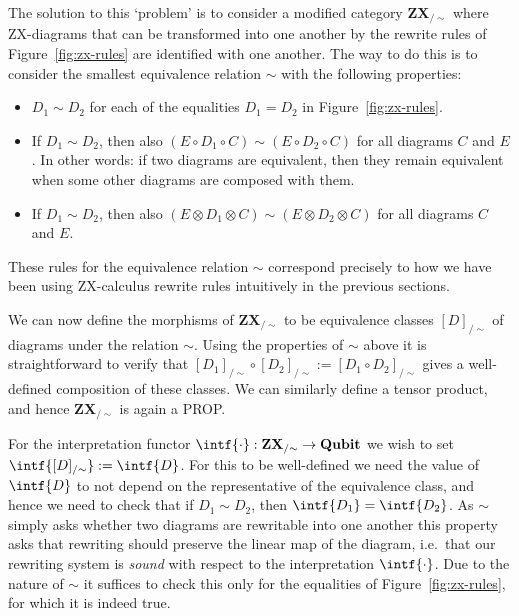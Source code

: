 \documentclass[a4paper,onecolumn,superscriptaddress,11pt,%
				unpublished,%
				allowfontchageintitle,%
				]{quantumarticle}
\begin{document}
The solution to this `problem' is to consider a modified category \textbf{ZX}$_{/\sim}$ where ZX-diagrams that can be transformed into one another by the rewrite rules of Figure~\ref{fig:zx-rules} are identified with one another. The way to do this is to consider the smallest equivalence relation $\sim$ with the following properties:
\begin{itemize}
	\item $D_1\sim D_2$ for each of the equalities $D_1=D_2$ in Figure~\ref{fig:zx-rules}.
	\item If $D_1\sim D_2$, then also $(E\circ D_1\circ C)\sim (E\circ D_2\circ C)$ for all diagrams $C$ and $E$. In other words: if two diagrams are equivalent, then they remain equivalent when some other diagrams are composed with them.
	\item If $D_1\sim D_2$, then also $(E\otimes D_1\otimes C)\sim (E\otimes D_2\otimes C)$ for all diagrams $C$ and $E$.
\end{itemize}
These rules for the equivalence relation $\sim$ correspond precisely to how we have been using ZX-calculus rewrite rules intuitively in the previous sections.

We can now define the morphisms of \textbf{ZX}$_{/\sim}$ to be equivalence classes $[D]_{/\sim}$ of diagrams under the relation $\sim$. Using the properties of $\sim$ above it is straightforward to verify that $[D_1]_{/\sim}\circ [D_2]_{/\sim} := [D_1\circ D_2]_{/\sim}$ gives a well-defined composition of these classes. We can similarly define a tensor product, and hence \textbf{ZX}$_{/\sim}$ is again a PROP.

For the interpretation functor $\intf{\cdot}:\textbf{ZX}_{/\sim}\rightarrow \textbf{Qubit}$ we wish to set $\intf{[D]_{/\sim}} := \intf{D}$. For this to be well-defined we need the value of $\intf{D}$ to not depend on the representative of the equivalence class, and hence we need to check that if $D_1\sim D_2$, then $\intf{D_1}=\intf{D_2}$. As $\sim$ simply asks whether two diagrams are rewritable into one another this property asks that rewriting should preserve the linear map of the diagram, i.e.~that our rewriting system is \emph{sound} with respect to the interpretation $\intf{\cdot}$. Due to the nature of $\sim$ it suffices to check this only for the equalities of Figure~\ref{fig:zx-rules}, for which it is indeed true.
\end{document}
